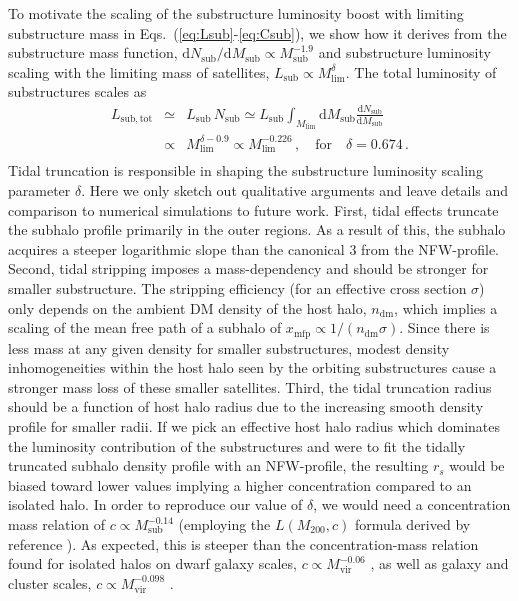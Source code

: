 \documentclass[10pt,aps,pra,reprint,amsmath,amsfonts,amssymb,showpacs,nofootinbib,floatfix]{revtex4-1}
\newcommand{\rmn}{\mathrm}
\newcommand{\sub}{\rmn{sub}}
\newcommand{\dd}{\rmn{d}}
\newcommand{\rs}{\ensuremath{r_s}}
\begin{document}
To motivate the scaling of the substructure luminosity boost with
limiting substructure mass in Eqs.~(\ref{eq:Lsub}-\ref{eq:Csub}), we
show how it derives from the substructure mass function, $\dd
N_\sub/\dd M_\rmn{sub} \propto M_\rmn{sub}^{-1.9}$
\cite{2008MNRAS.391.1685S,2008Natur.456...73S} and substructure
luminosity scaling with the limiting mass of satellites, $L_\sub
\propto M_\rmn{lim}^\delta$. The total luminosity of substructures scales
as
\begin{eqnarray}
  L_\rmn{sub,tot} &\simeq& L_\sub\,N_\sub \simeq L_\sub 
\int_{M_\rmn{lim}} \dd M_\rmn{sub} \frac{\dd N_\sub}{\dd M_\rmn{sub}} \nonumber\\
 &\propto& M_\rmn{lim}^{\delta-0.9} \propto M_\rmn{lim}^{-0.226}\,,\quad
\rmn{for}\quad \delta=0.674\,. \nonumber\\
&&
\end{eqnarray}
Tidal truncation is responsible in shaping the substructure luminosity
scaling parameter $\delta$. Here we only sketch out qualitative
arguments and leave details and comparison to numerical simulations to
future work. First, tidal effects truncate the subhalo profile
primarily in the outer regions. As a result of this, the subhalo
acquires a steeper logarithmic slope than the canonical 3 from the
NFW-profile. Second, tidal stripping imposes a mass-dependency and
should be stronger for smaller substructure.  The stripping efficiency
(for an effective cross section $\sigma$) only depends on the ambient
DM density of the host halo, $n_\rmn{dm}$, which implies a scaling of
the mean free path of a subhalo of $x_\rmn{mfp} \propto 1/(n_\rmn{dm}
\sigma)$. Since there is less mass at any given density for smaller
substructures, modest density inhomogeneities within the host halo
seen by the orbiting substructures cause a stronger mass loss of these
smaller satellites. Third, the tidal truncation radius should be a
function of host halo radius due to the increasing smooth density
profile for smaller radii.  If we pick an effective host halo radius
which dominates the luminosity contribution of the substructures and
were to fit the tidally truncated subhalo density profile with an
NFW-profile, the resulting $\rs$ would be biased toward lower values
implying a higher concentration compared to an isolated halo. In order
to reproduce our value of $\delta$, we would need a concentration mass
relation of $c\propto M_\rmn{sub}^{-0.14}$ (employing the
$L(M_{200},c)$ formula derived by reference
\cite{2009PhRvL.103r1302P}).  As expected, this is steeper than the
concentration-mass relation found for isolated halos on dwarf galaxy
scales, $c \propto M_\rmn{vir}^{-0.06}$ \cite{2011arXiv1101.2020I}, as
well as galaxy and cluster scales, $c \propto M_\rmn{vir}^{-0.098}$
\cite{2008MNRAS.391.1940M}.
\end{document}

